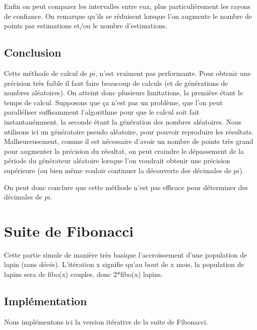 \documentclass[a4paper]{article}
\begin{document}
Enfin on peut comparer les intervalles entre eux, plus particulièrement les rayons de confiance. 
On remarque qu'ils se réduisent lorsque l'on augmente le nombre de points par estimations et/ou le nombre d'estimations.

\subsection{Conclusion}
Cette méthode de calcul de $pi$, n'est vraiment pas performante. Pour obtenir une précision très faible il faut faire beaucoup de calculs (et de générations de nombres aléatoires). 
On atteint donc plusieurs limitations, la première étant le temps de calcul. Supposons que ça n'est pas un problème, que l'on peut paralléliser suffisamment l'algorithme pour que le calcul soit fait instantanémment,
la seconde étant la génération des nombres aléatoires. Nous utilisons ici un génératoire pseudo aléatoire,
pour pouvoir reproduire les résultats. Malheureusement, comme il est nécessaire d'avoir un nombre de points très grand pour augmenter la précision du résultat, on peut craindre le dépassement 
de la période du générateur aléatoire lorsque l'on voudrait obtenir une précision supérieure (ou bien même vouloir continuer la découverte des décimales de $pi$).

On peut donc conclure que cette méthode n'est pas efficace pour déterminer des décimales de $pi$.

\section{Suite de Fibonacci}

Cette partie simule de manière très basique l'accroissement d'une population de lapin (sans décés). L'itération x signifie qu'au bout de x mois, la population de lapins sera de fibo(x) couples, donc 2*fibo(x) lapins.

\subsection{Implémentation}

Nous implémentons ici la version itérative de la suite de Fibonacci.

\begin{mdframed}[backgroundcolor=light-gray, roundcorner=20pt,
	leftmargin=-45, rightmargin=-45, 
	innerleftmargin=20, innertopmargin=1, innerbottommargin=1, 
	outerlinewidth=1, linecolor=darkgray]
	
\end{mdframed}
\end{document}
